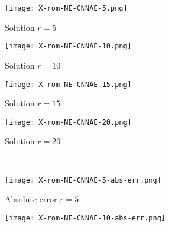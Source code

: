 \begin{figure}[!htb]
     \begin{center}
        \begin{subfigure}[b]{0.23\textwidth}
            \begin{center}
                \texttt{[image: X-rom-NE-CNNAE-5.png]}
            \end{center}
            \caption{Solution $r = 5$}
        \end{subfigure}
   \begin{subfigure}[b]{0.23\textwidth}
            \begin{center}
                \texttt{[image: X-rom-NE-CNNAE-10.png]}
            \end{center}
            \caption{Solution $r = 10$}
        \end{subfigure}
   \begin{subfigure}[b]{0.23\textwidth}
            \begin{center}
                \texttt{[image: X-rom-NE-CNNAE-15.png]}
            \end{center}
            \caption{Solution $r = 15$}
        \end{subfigure}
   \begin{subfigure}[b]{0.23\textwidth}
           \begin{center}
            \texttt{[image: X-rom-NE-CNNAE-20.png]}
           \end{center}
            \caption{Solution $r = 20$}
        \end{subfigure}\\  
        \begin{subfigure}[b]{0.23\textwidth}
            \begin{center}
                \texttt{[image: X-rom-NE-CNNAE-5-abs-err.png]}
            \end{center}
            \caption{Absolute error $r = 5$}
        \end{subfigure}  
        \begin{subfigure}[b]{0.23\textwidth}
            \begin{center}
                \texttt{[image: X-rom-NE-CNNAE-10-abs-err.png]}
            \end{center}

\end{subfigure}
\end{center}
\end{figure}
